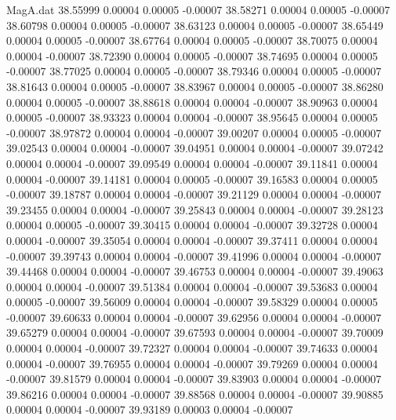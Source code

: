 \begin{filecontents}{MagA.dat}
  38.55999    0.00004    0.00005   -0.00007
  38.58271    0.00004    0.00005   -0.00007
  38.60798    0.00004    0.00005   -0.00007
  38.63123    0.00004    0.00005   -0.00007
  38.65449    0.00004    0.00005   -0.00007
  38.67764    0.00004    0.00005   -0.00007
  38.70075    0.00004    0.00004   -0.00007
  38.72390    0.00004    0.00005   -0.00007
  38.74695    0.00004    0.00005   -0.00007
  38.77025    0.00004    0.00005   -0.00007
  38.79346    0.00004    0.00005   -0.00007
  38.81643    0.00004    0.00005   -0.00007
  38.83967    0.00004    0.00005   -0.00007
  38.86280    0.00004    0.00005   -0.00007
  38.88618    0.00004    0.00004   -0.00007
  38.90963    0.00004    0.00005   -0.00007
  38.93323    0.00004    0.00004   -0.00007
  38.95645    0.00004    0.00005   -0.00007
  38.97872    0.00004    0.00004   -0.00007
  39.00207    0.00004    0.00005   -0.00007
  39.02543    0.00004    0.00004   -0.00007
  39.04951    0.00004    0.00004   -0.00007
  39.07242    0.00004    0.00004   -0.00007
  39.09549    0.00004    0.00004   -0.00007
  39.11841    0.00004    0.00004   -0.00007
  39.14181    0.00004    0.00005   -0.00007
  39.16583    0.00004    0.00005   -0.00007
  39.18787    0.00004    0.00004   -0.00007
  39.21129    0.00004    0.00004   -0.00007
  39.23455    0.00004    0.00004   -0.00007
  39.25843    0.00004    0.00004   -0.00007
  39.28123    0.00004    0.00005   -0.00007
  39.30415    0.00004    0.00004   -0.00007
  39.32728    0.00004    0.00004   -0.00007
  39.35054    0.00004    0.00004   -0.00007
  39.37411    0.00004    0.00004   -0.00007
  39.39743    0.00004    0.00004   -0.00007
  39.41996    0.00004    0.00004   -0.00007
  39.44468    0.00004    0.00004   -0.00007
  39.46753    0.00004    0.00004   -0.00007
  39.49063    0.00004    0.00004   -0.00007
  39.51384    0.00004    0.00004   -0.00007
  39.53683    0.00004    0.00005   -0.00007
  39.56009    0.00004    0.00004   -0.00007
  39.58329    0.00004    0.00005   -0.00007
  39.60633    0.00004    0.00004   -0.00007
  39.62956    0.00004    0.00004   -0.00007
  39.65279    0.00004    0.00004   -0.00007
  39.67593    0.00004    0.00004   -0.00007
  39.70009    0.00004    0.00004   -0.00007
  39.72327    0.00004    0.00004   -0.00007
  39.74633    0.00004    0.00004   -0.00007
  39.76955    0.00004    0.00004   -0.00007
  39.79269    0.00004    0.00004   -0.00007
  39.81579    0.00004    0.00004   -0.00007
  39.83903    0.00004    0.00004   -0.00007
  39.86216    0.00004    0.00004   -0.00007
  39.88568    0.00004    0.00004   -0.00007
  39.90885    0.00004    0.00004   -0.00007
  39.93189    0.00003    0.00004   -0.00007

\end{filecontents}
